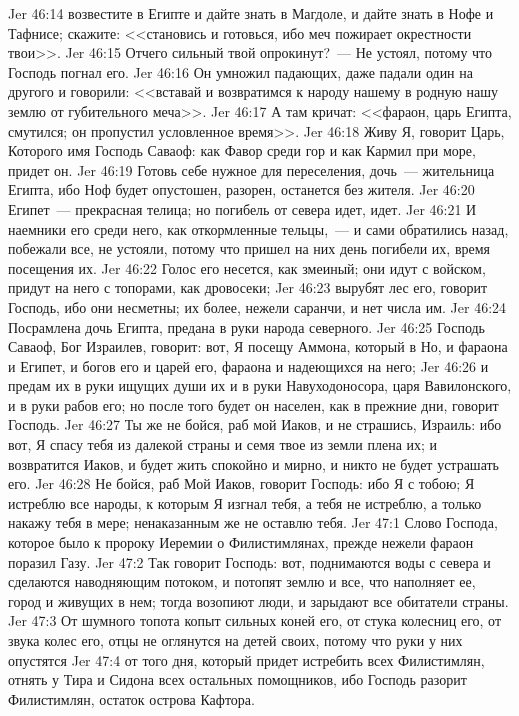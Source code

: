 \vs Jer 46:14 возвестите в Египте и дайте знать в Магдоле, и дайте знать в Нофе и Тафнисе; скажите: <<становись и готовься, ибо меч пожирает окрестности твои>>.
\vs Jer 46:15 Отчего сильный твой опрокинут?~--- Не устоял, потому что Господь погнал его.
\vs Jer 46:16 Он умножил падающих, даже падали один на другого и говорили: <<вставай и возвратимся к народу нашему в родную нашу землю от губительного меча>>.
\vs Jer 46:17 А там кричат: <<фараон, царь Египта, смутился; он пропустил условленное время>>.
\vs Jer 46:18 Живу Я, говорит Царь, Которого имя Господь Саваоф: как Фавор среди гор и как Кармил при море,  придет он.
\vs Jer 46:19 Готовь себе нужное для переселения, дочь~--- жительница Египта, ибо Ноф будет опустошен, разорен, останется без жителя.
\vs Jer 46:20 Египет~--- прекрасная телица; но погибель от севера идет, идет.
\vs Jer 46:21 И наемники его среди него, как откормленные тельцы,~--- и сами обратились назад, побежали все, не устояли, потому что пришел на них день погибели их, время посещения их.
\vs Jer 46:22 Голос его несется, как змеиный; они идут с войском, придут на него с топорами, как дровосеки;
\vs Jer 46:23 вырубят лес его, говорит Господь, ибо они несметны; их более, нежели саранчи, и нет числа им.
\vs Jer 46:24 Посрамлена дочь Египта, предана в руки народа северного.
\vs Jer 46:25 Господь Саваоф, Бог Израилев, говорит: вот, Я посещу Аммона, который в Но, и фараона и Египет, и богов его и царей его, фараона и надеющихся на него;
\vs Jer 46:26 и предам их в руки ищущих души их и в руки Навуходоносора, царя Вавилонского, и в руки рабов его; но после того будет он населен, как в прежние дни, говорит Господь.
\vs Jer 46:27 Ты же не бойся, раб мой Иаков, и не страшись, Израиль: ибо вот, Я спасу тебя из далекой страны и семя твое из земли плена их; и возвратится Иаков, и будет жить спокойно и мирно, и никто не будет устрашать его.
\vs Jer 46:28 Не бойся, раб Мой Иаков, говорит Господь: ибо Я с тобою; Я истреблю все народы, к которым Я изгнал тебя, а тебя не истреблю, а только накажу тебя в мере; ненаказанным же не оставлю тебя.
\vs Jer 47:1 Слово Господа, которое было к пророку Иеремии о Филистимлянах, прежде нежели фараон поразил Газу.
\vs Jer 47:2 Так говорит Господь: вот, поднимаются воды с севера и сделаются наводняющим потоком, и потопят землю и все, что наполняет ее, город и живущих в нем; тогда возопиют люди, и зарыдают все обитатели страны.
\vs Jer 47:3 От шумного топота копыт сильных коней его, от стука колесниц его, от звука колес его, отцы не оглянутся на детей своих, потому что руки у них опустятся
\vs Jer 47:4 от того дня, который придет истребить всех Филистимлян, отнять у Тира и Сидона всех остальных помощников, ибо Господь разорит Филистимлян, остаток острова Кафтора.
